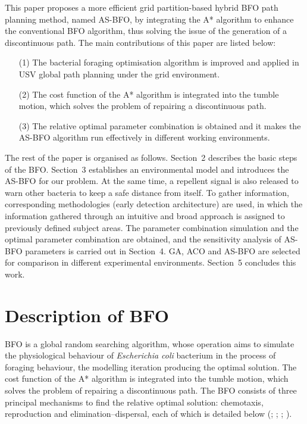 \documentclass{PDS}%
\theoremstyle{definition}
\begin{document}
This paper proposes a more efficient grid partition-based hybrid BFO path planning
method, named AS-BFO, by integrating the A* algorithm to enhance the conventional
BFO algorithm, thus solving the issue of the generation of a discontinuous path. The main
contributions of this paper are listed below:
\begin{enumerate}[(3)]
\item[(1)] The bacterial foraging optimisation algorithm is improved and applied in USV
global path planning under the grid environment.

\item[(2)] The cost function of the A* algorithm is integrated into the tumble motion, which
solves the problem of repairing a discontinuous path.

\item[(3)] The relative optimal parameter combination is obtained and it makes the AS-BFO algorithm
run effectively in different working environments.
\end{enumerate}

The rest of the paper is organised as follows. Section~2 describes the basic steps
of the BFO. Section~3 establishes an environmental model and introduces the AS-BFO for
our problem.  At the same time, a repellent signal is
also released to warn other bacteria to keep a safe distance from
itself.  To gather information, corresponding methodologies
(early detection architecture) are used, in which the information gathered through an
intuitive and broad approach is assigned to previously defined
subject areas. The parameter combination simulation and the optimal parameter combination
are obtained, and the sensitivity analysis of AS-BFO parameters is carried out in
Section~4. GA, ACO and AS-BFO are selected for comparison in different experimental
environments. Section~5 concludes this work.

\section{Description of BFO}\label{sec2}

BFO is a global random searching algorithm, whose operation aims to simulate the
physiological behaviour of \textit{Escherichia coli} bacterium in the process of foraging behaviour, the
modelling iteration producing the optimal solution. The cost function of the A* algorithm is integrated into the tumble motion, which
solves the problem of repairing a discontinuous path. The BFO consists of three principal
mechanisms to find the relative optimal solution: chemotaxis, reproduction and
elimination--dispersal, each of which is detailed below (\citealp{r21}; \citealp{r36};
\citealp{r37}; \citealp{r35}).
\end{document}
